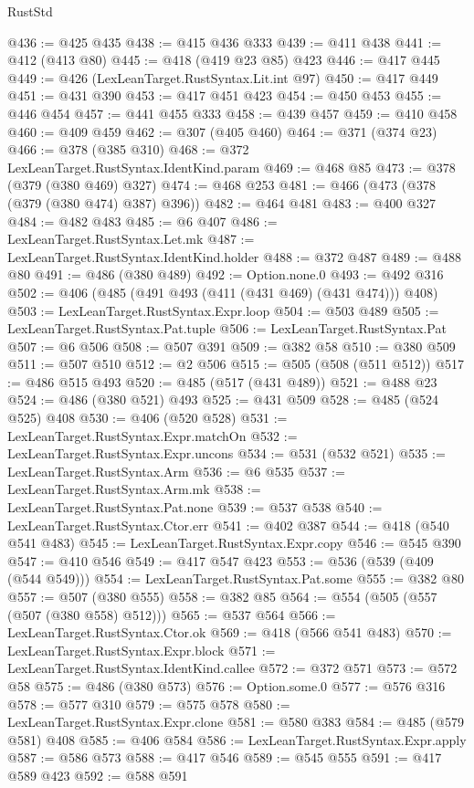 \begin{lexlean}{RustStd}
\begin{coremodule}
@436 := @425 @435
@438 := @415 @436 @333
@439 := @411 @438
@441 := @412 (@413 @80)
@445 := @418 (@419 @23 @85) @423
@446 := @417 @445
@449 := @426 (LexLeanTarget.RustSyntax.Lit.int @97)
@450 := @417 @449
@451 := @431 @390
@453 := @417 @451 @423
@454 := @450 @453
@455 := @446 @454
@457 := @441 @455 @333
@458 := @439 @457
@459 := @410 @458
@460 := @409 @459
@462 := @307 (@405 @460)
@464 := @371 (@374 @23)
@466 := @378 (@385 @310)
@468 := @372 LexLeanTarget.RustSyntax.IdentKind.param
@469 := @468 @85
@473 := @378 (@379 (@380 @469) @327)
@474 := @468 @253
@481 := @466 (@473 (@378 (@379 (@380 @474) @387) @396))
@482 := @464 @481
@483 := @400 @327
@484 := @482 @483
@485 := @6 @407
@486 := LexLeanTarget.RustSyntax.Let.mk
@487 := LexLeanTarget.RustSyntax.IdentKind.holder
@488 := @372 @487
@489 := @488 @80
@491 := @486 (@380 @489)
@492 := Option.none.{0}
@493 := @492 @316
@502 := @406 (@485 (@491 @493 (@411 (@431 @469) (@431 @474))) @408)
@503 := LexLeanTarget.RustSyntax.Expr.loop
@504 := @503 @489
@505 := LexLeanTarget.RustSyntax.Pat.tuple
@506 := LexLeanTarget.RustSyntax.Pat
@507 := @6 @506
@508 := @507 @391
@509 := @382 @58
@510 := @380 @509
@511 := @507 @510
@512 := @2 @506
@515 := @505 (@508 (@511 @512))
@517 := @486 @515 @493
@520 := @485 (@517 (@431 @489))
@521 := @488 @23
@524 := @486 (@380 @521) @493
@525 := @431 @509
@528 := @485 (@524 @525) @408
@530 := @406 (@520 @528)
@531 := LexLeanTarget.RustSyntax.Expr.matchOn
@532 := LexLeanTarget.RustSyntax.Expr.uncons
@534 := @531 (@532 @521)
@535 := LexLeanTarget.RustSyntax.Arm
@536 := @6 @535
@537 := LexLeanTarget.RustSyntax.Arm.mk
@538 := LexLeanTarget.RustSyntax.Pat.none
@539 := @537 @538
@540 := LexLeanTarget.RustSyntax.Ctor.err
@541 := @402 @387
@544 := @418 (@540 @541 @483)
@545 := LexLeanTarget.RustSyntax.Expr.copy
@546 := @545 @390
@547 := @410 @546
@549 := @417 @547 @423
@553 := @536 (@539 (@409 (@544 @549)))
@554 := LexLeanTarget.RustSyntax.Pat.some
@555 := @382 @80
@557 := @507 (@380 @555)
@558 := @382 @85
@564 := @554 (@505 (@557 (@507 (@380 @558) @512)))
@565 := @537 @564
@566 := LexLeanTarget.RustSyntax.Ctor.ok
@569 := @418 (@566 @541 @483)
@570 := LexLeanTarget.RustSyntax.Expr.block
@571 := LexLeanTarget.RustSyntax.IdentKind.callee
@572 := @372 @571
@573 := @572 @58
@575 := @486 (@380 @573)
@576 := Option.some.{0}
@577 := @576 @316
@578 := @577 @310
@579 := @575 @578
@580 := LexLeanTarget.RustSyntax.Expr.clone
@581 := @580 @383
@584 := @485 (@579 @581) @408
@585 := @406 @584
@586 := LexLeanTarget.RustSyntax.Expr.apply
@587 := @586 @573
@588 := @417 @546
@589 := @545 @555
@591 := @417 @589 @423
@592 := @588 @591

\end{coremodule}
\end{lexlean}
